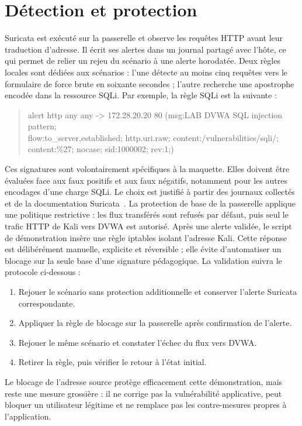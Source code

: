 \section{Détection et protection}\label{sec:detection-protection}

Suricata est exécuté sur la passerelle et observe les requêtes HTTP avant leur traduction d'adresse.
Il écrit ses alertes dans un journal partagé avec l'hôte, ce qui permet de relier un rejeu du scénario à une alerte horodatée.
Deux règles locales sont dédiées aux scénarios : l'une détecte au moins cinq requêtes vers le formulaire de force brute en soixante secondes ; l'autre recherche une apostrophe encodée dans la ressource SQLi.
Par exemple, la règle SQLi est la suivante :

\begin{quote}
    \small\ttfamily
    alert http any any -> 172.28.20.20 80 (msg:\textquotedbl{}LAB DVWA SQL injection pattern\textquotedbl;\\
    \quad flow:to\_server,established; http.uri.raw; content:\textquotedbl{}/vulnerabilities/sqli/\textquotedbl;\\
    \quad content:\textquotedbl{}\%27\textquotedbl; nocase; sid:1000002; rev:1;)
\end{quote}

Ces signatures sont volontairement spécifiques à la maquette.
Elles doivent être évaluées face aux faux positifs et aux faux négatifs, notamment pour les autres encodages d'une charge SQLi.
Le choix est justifié à partir des journaux collectés et de la documentation Suricata~\cite{suricata}.
La protection de base de la passerelle applique une politique restrictive : les flux transférés sont refusés par défaut, puis seul le trafic HTTP de Kali vers DVWA est autorisé.
Après une alerte validée, le script de démonstration insère une règle iptables isolant l'adresse Kali.
Cette réponse est délibérément manuelle, explicite et réversible ; elle évite d'automatiser un blocage sur la seule base d'une signature pédagogique.
La validation suivra le protocole ci-dessous :
\begin{enumerate}
    \item Rejouer le scénario sans protection additionnelle et conserver l'alerte Suricata correspondante.
    \item Appliquer la règle de blocage sur la passerelle après confirmation de l'alerte.
    \item Rejouer le même scénario et constater l'échec du flux vers DVWA\@.
    \item Retirer la règle, puis vérifier le retour à l'état initial.
\end{enumerate}

Le blocage de l'adresse source protège efficacement cette démonstration, mais reste une mesure grossière : il ne corrige pas la vulnérabilité applicative, peut bloquer un utilisateur légitime et ne remplace pas les contre-mesures propres à l'application.
